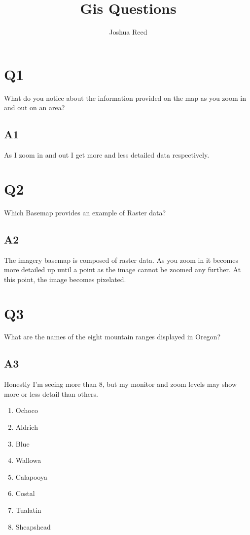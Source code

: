 \documentclass{article}
\author{Joshua Reed}
\title{Gis Questions}
\begin{document}
\maketitle{}
\section*{Q1}
What do you notice about the information provided on the map as you zoom
in and out on an area?

\subsection*{A1}
As I zoom in and out I get more and less detailed data respectively.

\section*{Q2}
Which Basemap provides an example of Raster data?

\subsection*{A2}
The imagery basemap is composed of raster data. As you zoom in it becomes more detailed up until a point as the 
image cannot be zoomed any further. At this point, the image becomes pixelated.

\section*{Q3}
What are the names of the eight mountain ranges displayed in Oregon?

\subsection*{A3}
Honestly I'm seeing more than 8, but  my monitor and zoom levels may show more or less detail than others.
\begin{enumerate}
\item Ochoco \item Aldrich \item Blue \item Wallowa \item Calapooya \item Costal \item Tualatin \item Sheapshead
\end{enumerate}
\end{document}
